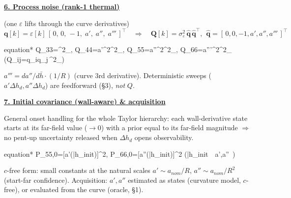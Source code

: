 \documentclass[11pt,a4paper,fontset=none]{ctexart}
\newcommand{\Dh}{\Delta h_d}
\newcommand{\ap}{{a'}}
\newcommand{\app}{{a''}}
\newcommand{\appp}{{a'''}}
\newcommand{\hd}[1]{\par\medskip\noindent\underline{\textbf{#1}}\par\nobreak\vspace{0.2ex}}
\begin{document}
\hd{6. Process noise (rank-1 thermal)} \; (one $\varepsilon$ lifts through the curve derivatives)
\[ \mathbf q[k]=\varepsilon[k]\,[\,0,\,0,\,-1,\;\ap,\;\app,\;\appp\,]^{\!\top}
   \quad\Rightarrow\quad
   \mathbf Q[k]=\sigma^2_\varepsilon\,\hat{\mathbf q}\,\hat{\mathbf q}^{\!\top},\ \
   \hat{\mathbf q}=[\,0,0,-1,\ap,\app,\appp\,]^{\!\top} \]
\begin{empheq}[box=\fbox]{equation*}
Q_{33}=\sigma^2_\varepsilon,\quad
Q_{44}={\ap}^2\sigma^2_\varepsilon,\quad
Q_{55}={\app}^2\sigma^2_\varepsilon,\quad
Q_{66}={\appp}^2\sigma^2_\varepsilon
\qquad(Q_{ij}=\hat q_i\hat q_j\,\sigma^2_\varepsilon)
\end{empheq}
$\appp=d\app/d\bar h\cdot(1/R)$ (curve 3rd derivative). Deterministic sweeps
($\ap\Dh,\app\Dh$) are feedforward (\S3), \emph{not} $Q$.

\hd{7. Initial covariance (wall-aware) \& acquisition}
General onset handling for the whole Taylor hierarchy: each wall-derivative state
starts at its far-field value ($\to0$) with a prior equal to its far-field magnitude
$\Rightarrow$ no pent-up uncertainty released when $\Dh$ opens observability.
\begin{empheq}[box=\fbox]{equation*}
P_{55,0}=[\ap(\bar h_{init})]^2,\qquad
P_{66,0}=[\app(\bar h_{init})]^2
\qquad(\bar h_{init}\ \Rightarrow\ \ap,\app\!\to{}\Rightarrow\ )
\end{empheq}
$c$-free form: small constants at the natural scales $\ap\!\sim\!a_{nom}/R$,
$\app\!\sim\!a_{nom}/R^2$ (start-far confidence). Acquisition: $\ap,\app$ estimated
as states (curvature model, $c$-free), or evaluated from the curve (oracle, \S1).
\end{document}

